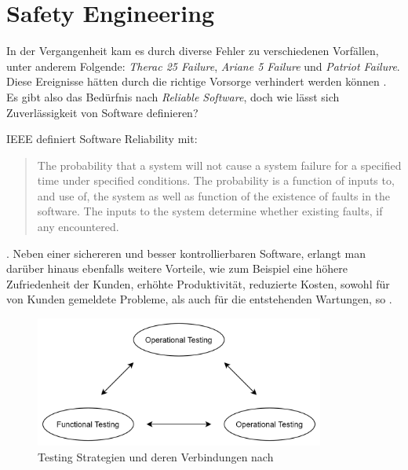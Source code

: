     \section{Safety Engineering}
        In der Vergangenheit kam es durch diverse Fehler zu verschiedenen Vorfällen, unter anderem Folgende:
        \textit{Therac 25 Failure}, \textit{Ariane 5 Failure} und \textit{Patriot Failure}. Diese Ereignisse hätten
        durch die richtige Vorsorge verhindert werden können \cite[s. 185]{Verma2015}. Es gibt also das Bedürfnis
        nach \textit{Reliable Software}, doch wie lässt sich Zuverlässigkeit von Software definieren?

        IEEE definiert Software Reliability mit:
        \begin{quote}
            The probability that a system will not cause a system failure for a specified time under specified conditions.
            The probability is a function of inputs to, and use of, the system as well as function of the existence of
            faults in the software. The inputs to the system determine whether existing faults, if any encountered.
        \end{quote}
        \cite[s. 183]{Verma2015}. Neben einer sichereren und besser kontrollierbaren Software, erlangt man darüber hinaus
        ebenfalls weitere Vorteile, wie zum Beispiel eine höhere Zufriedenheit der Kunden, erhöhte Produktivität, reduzierte
        Kosten, sowohl für von Kunden gemeldete Probleme, als auch für die entstehenden Wartungen, so \citeauthor*{Verma2015}.

        \begin{figure}[h]
            \begin{center}
                \includegraphics[width=0.85\textwidth]{figures/testing.png}
                \caption[Testing Strategies]{Testing Strategien und deren Verbindungen nach \cite{bertolino2019}}
                \label{pic:testing-strategies}
            \end{center}
        \end{figure}

